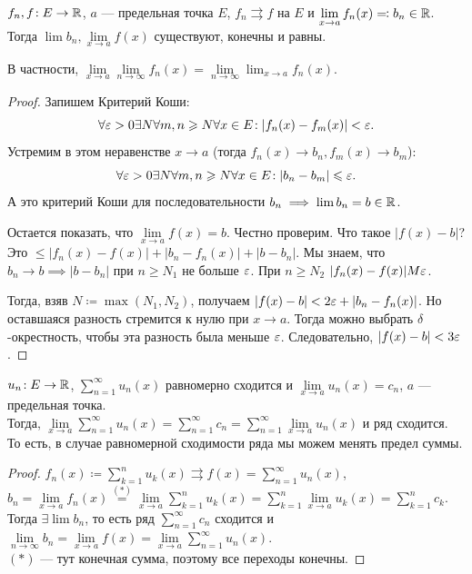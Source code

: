 \begin{theorem}
    $f_n, f\!: E \to \mathbb{R}$,  $a$ --- предельная точка  $E$,  $f_n \rightrightarrows f$ на  $E$ и  $\lim\limits_{x \to a} f_n(x) \eqqcolon b_n \in \mathbb{R}$. Тогда  $\lim b_n, \lim\limits_{x \to a} f(x)$ существуют, конечны и равны.

    В частности, $\lim\limits_{x \to a} \lim\limits_{n \to \infty} f_n(x) = \lim\limits_{n \to \infty} \lim_{x \to a} f_n(x)$.
\end{theorem}
\begin{proof}
    Запишем Критерий Коши:
    \[\forall \varepsilon > 0 \exists N\forall m, n \geqslant N \forall x \in E\!: |f_n(x) - f_m(x)| < \varepsilon.\] 
    Устремим в этом неравенстве $x \to a$ (тогда $f_n(x) \to b_n, f_m(x) \to b_m$):
    \[
    \forall \varepsilon > 0 \exists N\forall m, n \geqslant N \forall x \in E\!: |b_n - b_m| \leqslant \varepsilon 
    .\] А это критерий Коши для последовательности $b_n \implies \lim b_n = b \in \mathbb{R}$.

    Остается показать, что $\lim\limits_{x \to a} f(x) = b$. Честно проверим. Что такое $|f(x) - b|$? Это  $\le |f_n(x) - f(x)| + |b_n - f_n(x)| + |b-b_n|$. Мы знаем, что $b_n \to b \implies |b-b_n|$ при  $n \ge N_1$ не больше $\varepsilon$. При  $n \ge N_2$ $|f_n(x) - f(x)| M \varepsilon$. 

    Тогда, взяв  $N \coloneqq \max(N_1, N_2)$, получаем $|f(x) - b| < 2\varepsilon + |b_n - f_n(x)|$. Но оставшаяся разность стремится к нулю при  $x \to a$. Тогда можно выбрать $\delta$-окрестность, чтобы эта разность  была меньше $\varepsilon$. Следовательно,  $|f(x) - b| < 3\varepsilon$.
\end{proof}
\begin{theorem}
    $u_n\!: E \to \mathbb{R}$,  $\sum\limits_{n=1}^\infty u_n(x)$ равномерно сходится и $\lim\limits_{x \to a}u_n(x) = c_n$, $a$ --- предельная точка.
\\
   Тогда,  $\lim\limits_{x \to a} \sum\limits_{n=1}^\infty u_n(x) = \sum\limits_{n=1}^\infty c_n = \sum\limits_{n=1}^\infty \lim\limits_{x \to a}u_n(x)$ и ряд сходится.
\\
   То есть, в случае равномерной сходимости ряда мы можем менять предел суммы.
\end{theorem}
\begin{proof}
    $f_n(x) \coloneqq \sum\limits_{k=1}^n u_k(x) \rightrightarrows f(x) = \sum\limits_{n=1}^\infty u_n(x)$, $b_n = \lim\limits_{x \to a} f_n(x) \overset{(*)}{=} \lim\limits_{x \to a} \sum\limits_{k=1}^n u_k(x) = \sum\limits_{k=1}^n \lim\limits_{x \to a} u_k(x) = \sum\limits_{k=1}^n c_k$.
\\
    Тогда $\exists \lim b_n$, то есть ряд $\sum\limits_{n=1}^\infty c_n$ сходится и $\lim\limits_{n \to \infty} b_n = \lim\limits_{x \to a} f(x) = \lim\limits_{x \to a} \sum\limits_{n=1}^\infty u_n(x)$.
\\
     $(*)$ --- тут конечная сумма, поэтому все переходы конечны.
\end{proof}
